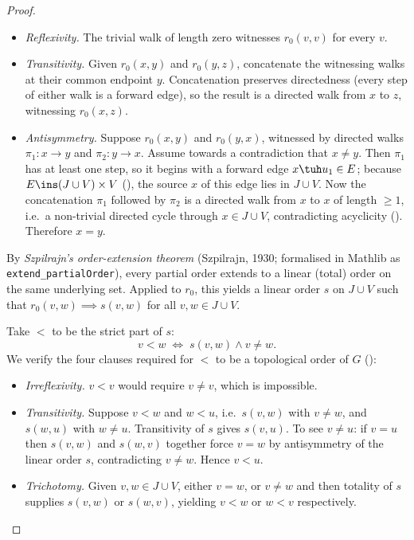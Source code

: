 \documentclass[main]{subfiles}
\begin{document}
\begin{proof}
\begin{itemize}
\item \emph{Reflexivity.} The trivial walk of length zero witnesses $r_0(v, v)$ for every $v$.

\item \emph{Transitivity.} Given $r_0(x, y)$ and $r_0(y, z)$, concatenate the witnessing walks at their common endpoint $y$. Concatenation preserves directedness (every step of either walk is a forward edge), so the result is a directed walk from $x$ to $z$, witnessing $r_0(x, z)$.

\item \emph{Antisymmetry.} Suppose $r_0(x, y)$ and $r_0(y, x)$, witnessed by directed walks $\pi_1 \colon x \to y$ and $\pi_2 \colon y \to x$. Assume towards a contradiction that $x \neq y$. Then $\pi_1$ has at least one step, so it begins with a forward edge $x \tuh u_1 \in E$; because $E \ins (J \cup V) \times V$ (), the source $x$ of this edge lies in $J \cup V$. Now the concatenation $\pi_1$ followed by $\pi_2$ is a directed walk from $x$ to $x$ of length $\geq 1$, i.e.\ a non-trivial directed cycle through $x \in J \cup V$, contradicting acyclicity (). Therefore $x = y$.
\end{itemize}

By \emph{Szpilrajn's order-extension theorem} (Szpilrajn, 1930; formalised
in Mathlib as \texttt{extend\_partialOrder}), every partial order extends
to a linear (total) order on the same underlying set. Applied to $r_0$,
this yields a linear order $s$ on $J \cup V$ such that
$r_0(v, w) \implies s(v, w)$ for all $v, w \in J \cup V$.

Take $<$ to be the strict part of $s$:
\[
  v < w \;\iff\; s(v, w) \wedge v \neq w.
\]
We verify the four clauses required for $<$ to be a topological order of
$G$ ():

\begin{itemize}
\item \emph{Irreflexivity.} $v < v$ would require $v \neq v$, which is impossible.

\item \emph{Transitivity.} Suppose $v < w$ and $w < u$, i.e.\ $s(v, w)$ with $v \neq w$, and $s(w, u)$ with $w \neq u$. Transitivity of $s$ gives $s(v, u)$. To see $v \neq u$: if $v = u$ then $s(v, w)$ and $s(w, v)$ together force $v = w$ by antisymmetry of the linear order $s$, contradicting $v \neq w$. Hence $v < u$.

\item \emph{Trichotomy.} Given $v, w \in J \cup V$, either $v = w$, or $v \neq w$ and then totality of $s$ supplies $s(v, w)$ or $s(w, v)$, yielding $v < w$ or $w < v$ respectively.


\end{itemize}
\end{proof}
\end{document}
